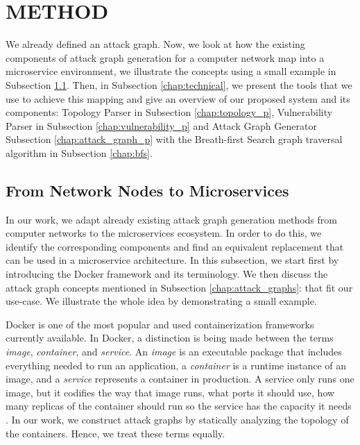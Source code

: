 \section{METHOD}
\label{chap:method}
We already defined an attack graph. Now, we look at how the existing components of attack graph generation for a computer network map into a microservice environment, we illustrate the concepts using a small example in Subsection \ref{chap:mapping}. Then, in Subsection \ref{chap:technical}, we present the tools that we use to achieve this mapping and give an overview of our proposed system and its components: Topology Parser in Subsection \ref{chap:topology_p}, Vulnerability Parser in Subsection \ref{chap:vulnerability_p} and Attack Graph Generator Subsection \ref{chap:attack_graph_p} with the Breath-first Search graph traversal algorithm in Subsection \ref{chap:bfs}. 


\subsection{From Network Nodes to Microservices}
\label{chap:mapping}
In our work, we adapt already existing attack graph generation methods from computer networks to the microservices ecosystem. In order to do this, we identify the corresponding components and find an equivalent replacement that can be used in a microservice architecture. In this subsection, we start first by introducing the Docker framework and its terminology. We then discuss the attack graph concepts mentioned in Subsection \ref{chap:attack_graphs}:  that fit our use-case. We illustrate the whole idea  by demonstrating a small example.

Docker is one of the most popular and used containerization frameworks currently available. In Docker, a distinction is being made between the terms \textit{image}, \textit{container}, and \textit{service}. An \textit{image} is an executable package that includes everything needed to run an application, a \textit{container} is a runtime instance of an image, and a \textit{service} represents a container in production. A service only runs one image, but it codifies the way that image runs, what ports it should use, how many replicas of the container should run so the service has the capacity it needs \cite{merkel2014docker}. In our work, we construct attack graphs by statically analyzing the topology of the containers. Hence, we treat these terms equally.  

